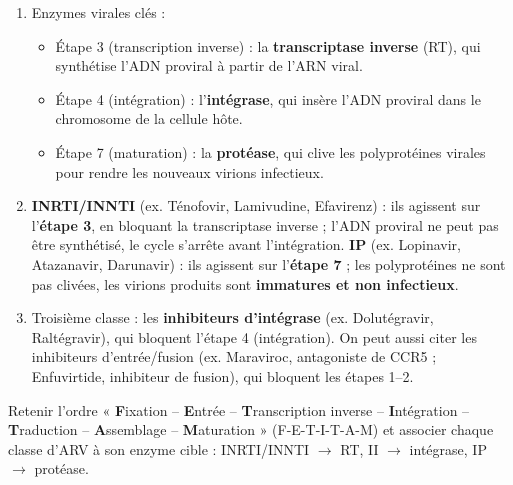 \documentclass[11pt]{article}
\begin{document}
\begin{corrige}
\begin{enumerate}
    \item Enzymes virales clés :
    \begin{itemize}
        \item Étape 3 (transcription inverse) : la \textbf{transcriptase inverse} (RT), qui synthétise l'ADN proviral à partir de l'ARN viral.
        \item Étape 4 (intégration) : l'\textbf{intégrase}, qui insère l'ADN proviral dans le chromosome de la cellule hôte.
        \item Étape 7 (maturation) : la \textbf{protéase}, qui clive les polyprotéines virales pour rendre les nouveaux virions infectieux.
    \end{itemize}
    \item \textbf{INRTI/INNTI} (ex. Ténofovir, Lamivudine, Efavirenz) : ils agissent sur l'\textbf{étape 3}, en bloquant la transcriptase inverse ; l'ADN proviral ne peut pas être synthétisé, le cycle s'arrête avant l'intégration. \textbf{IP} (ex. Lopinavir, Atazanavir, Darunavir) : ils agissent sur l'\textbf{étape 7} ; les polyprotéines ne sont pas clivées, les virions produits sont \textbf{immatures et non infectieux}.
    \item Troisième classe : les \textbf{inhibiteurs d'intégrase} (ex. Dolutégravir, Raltégravir), qui bloquent l'étape 4 (intégration). On peut aussi citer les inhibiteurs d'entrée/fusion (ex. Maraviroc, antagoniste de CCR5 ; Enfuvirtide, inhibiteur de fusion), qui bloquent les étapes 1--2.
\end{enumerate}
\begin{methode}
Retenir l'ordre « \textbf{F}ixation -- \textbf{E}ntrée -- \textbf{T}ranscription inverse -- \textbf{I}ntégration -- \textbf{T}raduction -- \textbf{A}ssemblage -- \textbf{M}aturation » (F-E-T-I-T-A-M) et associer chaque classe d'ARV à son enzyme cible : INRTI/INNTI $\rightarrow$ RT, II $\rightarrow$ intégrase, IP $\rightarrow$ protéase.
\end{methode}
\end{corrige}
\end{document}
